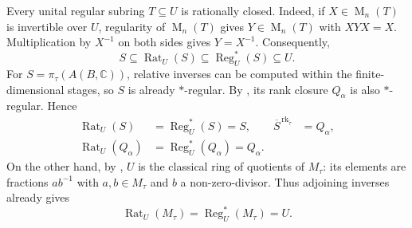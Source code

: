 \documentclass[11pt]{amsart}
\DeclareMathOperator{\rk}{rk}
\DeclareMathOperator{\Mat}{M}
\theoremstyle{definition}
\theoremstyle{remark}
\begin{document}
Every unital regular subring $T\subseteq U$ is rationally closed.
Indeed, if $X\in\Mat_n(T)$ is invertible over $U$, regularity of
$\Mat_n(T)$ gives $Y\in\Mat_n(T)$ with $XYX=X$.
Multiplication by $X^{-1}$ on both sides gives $Y=X^{-1}$.
Consequently,
\begin{equation}\label{eq:algebraic-closure-inclusions}
 S\subseteq\operatorname{Rat}_U(S)
 \subseteq\operatorname{Reg}^{*}_U(S)\subseteq U.
\end{equation}
For $S=\pi_\tau(A(B,\mathbb C))$, relative inverses can be
computed within the finite-dimensional stages, so $S$ is already
$*$-regular.  By , its rank
closure $Q_\alpha$ is also $*$-regular.  Hence
\begin{equation}\label{eq:core-algebraic-closures}
 \begin{aligned}
 \operatorname{Rat}_U(S)&=\operatorname{Reg}^{*}_U(S)=S,
 &\overline S^{\,\rk_{\widetilde\tau}}&=Q_\alpha,\\
 \operatorname{Rat}_U(Q_\alpha)&=
 \operatorname{Reg}^{*}_U(Q_\alpha)=Q_\alpha.
 \end{aligned}
\end{equation}
On the other hand, by , $U$ is the
classical ring of quotients of $M_\tau$: its elements are fractions
$ab^{-1}$ with $a,b\in M_\tau$
and $b$ a non-zero-divisor.  Thus adjoining inverses already gives
\[
 \operatorname{Rat}_U(M_\tau)=\operatorname{Reg}^{*}_U(M_\tau)=U.
\]
\end{document}
